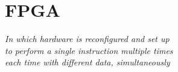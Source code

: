 \chapter{FPGA}\label{ch:fpga}

\begin{flushright}{\slshape
    In which hardware is reconfigured and set up\\
    to perform a single instruction multiple times\\
    each time with different data, simultaneously
}
\end{flushright}


